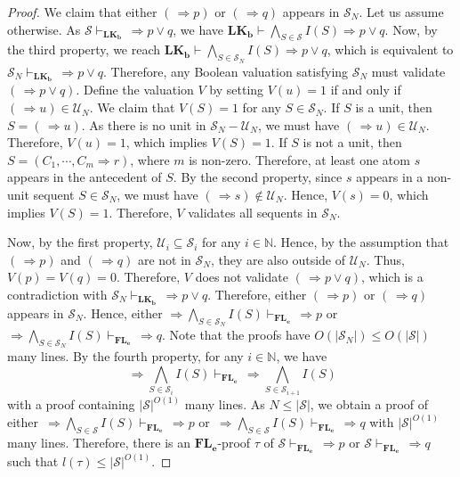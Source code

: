 \documentclass[10pt,a4paper]{amsart}
\newcommand{\LKb}{\mathbf{LK_b}}
\begin{document}
\begin{proof}
We claim that either $(\, \Rightarrow p)$ or $(\, \Rightarrow q)$ appears in $\mathcal{S}_N$. Let us assume otherwise. As $\mathcal{S} \vdash_{\LKb} \, \Rightarrow p \vee q$, we have $\LKb \vdash \bigwedge_{S \in \mathcal{S}} I(S) \Rightarrow p \vee q$. Now, by the third property, we reach $\LKb \vdash \bigwedge_{S \in \mathcal{S}_N} I(S) \Rightarrow p \vee q$, which is equivalent to $\mathcal{S}_N \vdash_{\LKb} \, \Rightarrow p \vee q$. Therefore, any Boolean valuation satisfying $\mathcal{S}_N$ must validate $(\, \Rightarrow p \vee q)$.
Define the valuation $V$ by setting $V(u)=1$ if and only if $(\, \Rightarrow u) \in \mathcal{U}_N$. We claim that $V(S)=1$ for any $S \in \mathcal{S}_N$. If $S$ is a unit, then $S=(\, \Rightarrow u)$. As there is no unit in $\mathcal{S}_N-\mathcal{U}_N$, we must have $(\, \Rightarrow u) \in \mathcal{U}_N$. Therefore, $V(u)=1$, which implies $V(S)=1$. If $S$ is not a unit, then $S=(C_1, \cdots, C_m \Rightarrow r)$, where $m$ is non-zero. Therefore, at least one atom $s$ appears in the antecedent of $S$. By the second property, since $s$ appears in a non-unit sequent $S \in \mathcal{S}_N$, we must have $(\, \Rightarrow s) \notin \mathcal{U}_N$. Hence, $V(s)=0$, which implies $V(S)=1$. Therefore, $V$ validates all sequents in $\mathcal{S}_N$.

Now, by the first property, $\mathcal{U}_i \subseteq \mathcal{S}_i$ for any $i \in \mathbb{N}$. Hence, by the assumption that $(\, \Rightarrow p)$ and $(\, \Rightarrow q)$ are not in $\mathcal{S}_N$, they are also outside of $\mathcal{U}_N$. Thus, $V(p)=V(q)=0$. Therefore, $V$ does not validate $(\, \Rightarrow p \vee q)$, which is a contradiction with $\mathcal{S}_N \vdash_{\LKb} \, \Rightarrow p \vee q$. Therefore, either $(\, \Rightarrow p)$ or $(\, \Rightarrow q)$ appears in $\mathcal{S}_N$. Hence, either $\Rightarrow \bigwedge_{S \in \mathcal{S}_N} I(S) \vdash_{\mathbf{FL_e}} \, \Rightarrow p$ or $\Rightarrow \bigwedge_{S \in \mathcal{S}_N} I(S) \vdash_{\mathbf{FL_e}} \, \Rightarrow q$. Note that the proofs have $O(|\mathcal{S}_N|)\leq O(|\mathcal{S}|)$ many lines.
By the fourth property, for any $i \in \mathbb{N}$, we have 
\[
\, \Rightarrow \bigwedge_{S \in \mathcal{S}_i} I(S) \vdash_{\mathbf{FL_e}} \, \Rightarrow \bigwedge_{S \in \mathcal{S}_{i+1}} I(S)
\]
with a proof containing $|\mathcal{S}|^{O(1)}$ many lines. As $N \leq |\mathcal{S}|$, we obtain a proof of either $\, \Rightarrow \bigwedge_{S \in \mathcal{S}} I(S) \vdash_{\mathbf{FL_e}} \, \Rightarrow p$ or $\, \Rightarrow \bigwedge_{S \in \mathcal{S}} I(S) \vdash_{\mathbf{FL_e}} \, \Rightarrow q$ with $|\mathcal{S}|^{O(1)}$ many lines. Therefore, there is an $\mathbf{FL_e}$-proof $\tau$ of $\mathcal{S} \vdash_{\mathbf{FL_e}} \, \Rightarrow p$ or $\mathcal{S} \vdash_{\mathbf{FL_e}} \, \Rightarrow q$ such that $l(\tau) \leq |\mathcal{S}|^{O(1)}$.
\end{proof}
\end{document}
